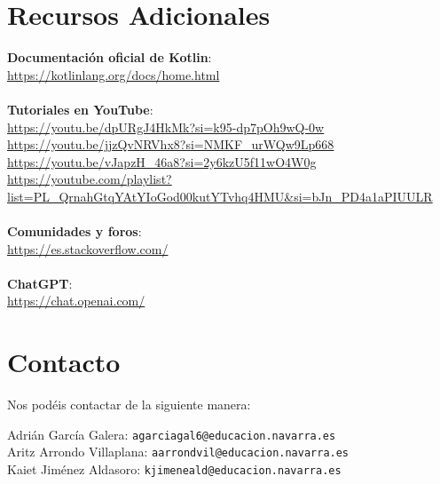 \documentclass{article}
\begin{document}
\section{Recursos Adicionales}

\textbf{Documentación oficial de Kotlin}: \\
\url{https://kotlinlang.org/docs/home.html} \\
\\
\textbf{Tutoriales en YouTube}: \\
\url{https://youtu.be/dpURgJ4HkMk?si=k95-dp7pOh9wQ-0w} \\
\url{https://youtu.be/jjzQvNRVhx8?si=NMKF_urWQw9Lp668} \\
\url{https://youtu.be/vJapzH_46a8?si=2y6kzU5f11wO4W0g} \\
\url{https://youtube.com/playlist?list=PL_QrnahGtqYAtYIoGod00kutYTvhq4HMU&si=bJn_PD4a1aPIUULR} \\
\\
\textbf{Comunidades y foros}: \\
\url{https://es.stackoverflow.com/} \\
\\
\textbf{ChatGPT}: \\
\url{https://chat.openai.com/}

\section{Contacto}

Nos podéis contactar de la siguiente manera:

Adrián García Galera: \texttt{agarciagal6@educacion.navarra.es} \\
Aritz Arrondo Villaplana: \texttt{aarrondvil@educacion.navarra.es} \\
Kaiet Jiménez Aldasoro: \texttt{kjimeneald@educacion.navarra.es}
\end{document}
